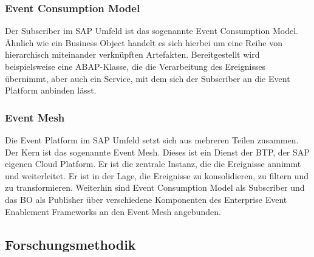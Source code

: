 \subsubsection*{Event Consumption Model}
\label{ecm}
Der Subscriber im SAP Umfeld ist das sogenannte Event Consumption Model. Ähnlich wie ein Business Object handelt es sich hierbei um eine Reihe von hierarchisch miteinander verknüpften Artefakten. Bereitgestellt wird beispielsweise eine \ac{ABAP}-Klasse, die die Verarbeitung des Ereignisses übernimmt, aber auch ein Service, mit dem sich der Subscriber an die Event Platform anbinden lässt. \cite[Vgl.][]{sapse_bes}

\subsubsection*{Event Mesh}
Die Event Platform im  SAP Umfeld setzt sich aus mehreren Teilen zusammen. Der Kern ist das sogenannte Event Mesh. Dieses ist ein Dienst der \ac{BTP}, der SAP eigenen Cloud Platform. Er ist die zentrale Instanz, die die Ereignisse annimmt und weiterleitet. Er ist in der Lage, die Ereignisse zu konsolidieren, zu filtern und zu transformieren. Weiterhin sind Event Consumption Model als Subscriber und das \ac{BO} als Publisher über verschiedene Komponenten des Enterprise Event Enablement Frameworks an den Event Mesh angebunden.\ \cite[Vgl.][]{sapse_evm}

\subsection{Forschungsmethodik}
